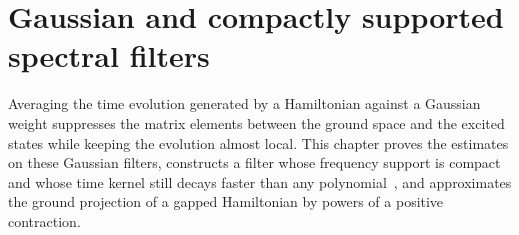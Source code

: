 \chapter{Gaussian and compactly supported spectral filters}
\label{ch:gaussian_filters}

Averaging the time evolution generated by a Hamiltonian against a Gaussian
weight suppresses the matrix elements between the ground space and the excited
states while keeping the evolution almost local. This chapter proves the
estimates on these Gaussian filters, constructs a filter whose frequency
support is compact and whose time kernel still decays faster than any
polynomial~\cite[Lemma~4.2]{OpenAI2026AreaLaw}, and approximates the ground
projection of a gapped Hamiltonian by powers of a positive contraction.














